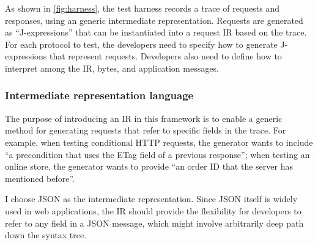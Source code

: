 \documentclass{article}
\begin{document}
As shown in \autoref{fig:harness}, the test harness records a trace of requests
and responses, using an generic intermediate representation.  Requests are
generated as ``J-expressions'' that can be instantiated into a request IR based
on the trace.  For each protocol to test, the developers need to specify how to
generate J-expressions that represent requests.  Developers also need to define
how to interpret among the IR, bytes, and application messages.

\subsubsection{Intermediate representation language}
The purpose of introducing an IR in this framework is to enable a generic method
for generating requests that refer to specific fields in the trace.  For
example, when testing conditional HTTP requests, the generator wants to include
``a precondition that uses the ETag field of a previous response''; when testing
an online store, the generator wants to provide ``an order ID that the server
has mentioned before''.

I choose JSON as the intermediate representation.  Since JSON itself is widely
used in web applications, the IR should provide the flexibility for developers
to refer to any field in a JSON message, which might involve arbitrarily deep
path down the syntax tree.
\end{document}

